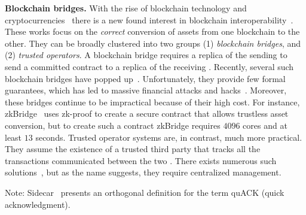 \par \textbf{Blockchain bridges.} With the rise of blockchain technology and cryptocurrencies~\cite{splitbft,rbft,basalt,bitcoin-johnnatan,nakamoto-narula,epaxos-revisit,simulation-blockchain,maria-thesis,poe,multibft-disc,rcc,bc-processing,dissecting-trusted,relax-liveness-neil,beegees,suyash-phd-thesis,blockchain-book,geobft,ccf-heidi,pvp,hotstuff,bbca-ledger,prestigebft,eesmr-bft,narwhal,chemistry}
there is a new found interest in blockchain interoperability~\cite{atomic-cross-chain-swap,blockchain-interop-survey,pow-sidechains,trustboost,sok-cross-chain,analyze-inter-blockchain-communication,blockchain-interoperability-survey, ccip}.  These works focus on the {\em correct} conversion of assets from one blockchain to the other. They can be broadly clustered into two groups (1) {\em blockchain bridges}, and (2) {\em trusted operators}. A blockchain bridge requires a replica of the sending \RSM{} to send a committed contract to a replica of the receiving \RSM{}. Recently, several such blockchain bridges have popped up~\cite{polynetwork,rainbrow-bridge,axelar-bridge}. Unfortunately, they provide few formal
guarantees, which has led to massive financial attacks and hacks~\cite{sok-cross-chain,zkbridge,trustboost}. Moreover, 
these bridges continue to be impractical because of their high cost.
For instance, zkBridge~\cite{zkbridge} uses zk-proof to create a secure contract that allows trustless asset conversion, but to create such a contract zkBridge requires $4096$ cores and at least $13$ seconds.
Trusted operator systems are, in contrast, much more practical. They assume the existence of a trusted third party that tracks all the transactions communicated between the two . 
There exists numerous such solutions~\cite{polkadot,cosmos,blockchain-interoperability-survey}, but as the name suggests, they require centralized management.

Note: Sidecar~\cite{sidecar} presents an orthogonal definition for the term quACK (quick acknowledgment).
